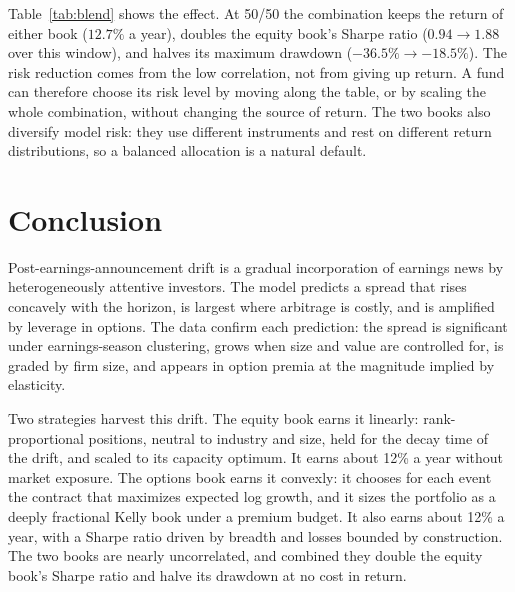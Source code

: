 \documentclass[11pt]{article}
\theoremstyle{definition}
\newcommand{\1}{\mathbf{1}}
\begin{document}
Table~\ref{tab:blend} shows the effect. At 50/50 the combination keeps the return of either
book ($12.7\%$ a year), doubles the equity book's Sharpe ratio ($0.94\to1.88$ over this window),
and halves its maximum drawdown ($-36.5\%\to-18.5\%$). The risk reduction comes from the
low correlation, not from giving up return. A fund can therefore choose its risk level by
moving along the table, or by scaling the whole combination, without changing the source of
return. The two books also diversify model risk: they use different instruments and rest on
different return distributions, so a balanced allocation is a natural default.

\section{Conclusion}

Post-earnings-announcement drift is a gradual incorporation of earnings news by
heterogeneously attentive investors. The model predicts a spread that rises concavely with
the horizon, is largest where arbitrage is costly, and is amplified by leverage in options. The
data confirm each prediction: the spread is significant under earnings-season clustering,
grows when size and value are controlled for, is graded by firm size, and appears in option
premia at the magnitude implied by elasticity.

Two strategies harvest this drift. The equity book earns it linearly: rank-proportional
positions, neutral to industry and size, held for the decay time of the drift, and scaled
to its capacity optimum. It earns about 12\% a year without market exposure. The options
book earns it convexly: it chooses for each event the contract that maximizes expected
log growth, and it sizes the portfolio as a deeply fractional Kelly book under a premium
budget. It also earns about 12\% a year, with a Sharpe ratio driven by breadth and losses
bounded by construction. The two books are nearly uncorrelated, and combined they
double the equity book's Sharpe ratio and halve its drawdown at no cost in return.

\vspace{1em}
\noindent{}
\end{document}
